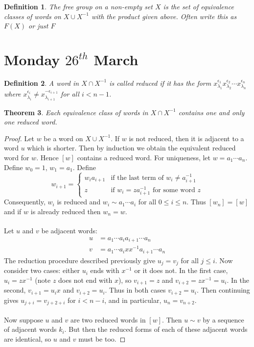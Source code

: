 \documentclass[a4paper,10pt]{article}
\newtheorem{thm}{Theorem}
\newtheorem{Def}[thm]{Definition}
\begin{document}
\begin{Def}
The free group on a non-empty set $X$ is the set of equivalence classes of words on $X \cup X^{-1}$ with the product given above. Often write this as $F(X)$ or just $F$
\end{Def}

\newpage
\section{Monday $26^{th}$ March}

\begin{Def}
A word in $X \cap X^{-1}$ is called reduced if it has the form $x_{\lambda_1}^{\epsilon_1}x_{\lambda_2}^{\epsilon_2}\cdots x_{\lambda_n}^{\epsilon_n}$ where $x_{\lambda_i}^{\epsilon_i} \neq x_{\lambda_{i+1}}^{-\epsilon_{i+1}}$ for all $i < n-1$. 
\end{Def}

\begin{thm}
Each equivalence class of words in $X \cap X^{-1}$ contains one and only one reduced word. 
\end{thm}

\begin{proof}
Let $w$ be a word on $X \cup X^{-1}$. If $w$ is not reduced, then it is adjacent to a word $u$ which is shorter. Then by induction we obtain the equivalent reduced word for $w$. Hence $[w]$ contains a reduced word. For uniqueness, let $w = a_1 \cdots a_n$. Define $w_0 = 1$, $w_1 = a_1$. Define 
\[ w_{i+1} = \begin{cases} w_{i} a_{i+1} & \text{if the last term of } w_i \neq a_{i+1}^{-1} \\
                          z              & \text{if } w_i = za_{i+1}^{-1} \text{ for some word } z
 \end{cases} \]
Consequently, $w_i$ is reduced and $w_i \sim a_1 \cdots a_i$ for all $0 \leq i \leq n$. Thus $[w_n] = [w]$ and if $w$ is already reduced then $w_n = w$. \\
\\
Let $u$ and $v$ be adjacent words:
\begin{align*}
u &= a_1 \cdots a_i a_{i+1} \cdots a_n \\
v &= a_1 \cdots a_i x x^{-1} a_{i+1} \cdots a_n
\end{align*}
The reduction procedure described previously give $u_j = v_j$ for all $j \leq i$. Now consider two cases: either $u_i$ ends with $x^{-1}$ or it does not. In the first case, $u_i = z x^{-1}$ (note $z$ does not end with $x$), so $v_{i+1} = z$ and $v_{i+2} = zx^{-1} = u_i$. In the second, $v_{i+1} = u_i x$ and $v_{i+2} = u_i$. Thus in both cases $v_{i+2} = u_i$. Then continuing gives $u_{j+i} = v_{j+2 + i}$ for $i < n - i$, and in particular, $u_n = v_{n + 2}$. \\
\\
Now suppose $u$ and $v$ are two reduced words in $[w]$. Then $u \sim v$ by a sequence of adjacent words $k_i$. But then the reduced forms of each of these adjacent words are identical, so $u$ and $v$ must be too. 
\end{proof}
\end{document}
